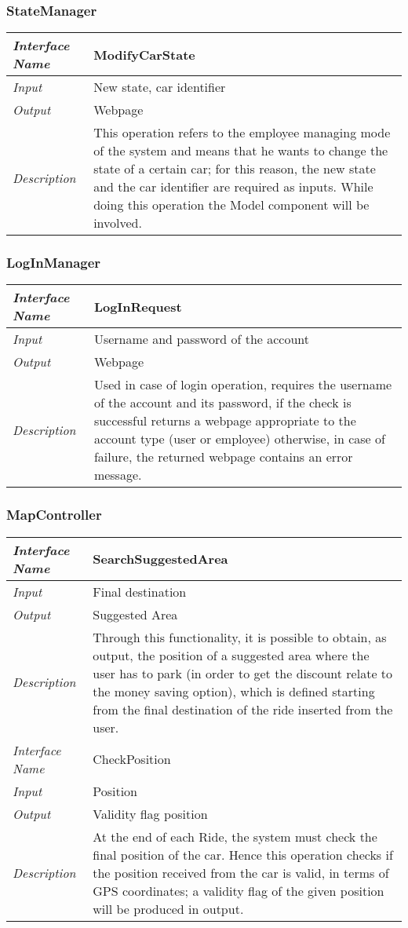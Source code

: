 \documentclass[11pt,a4paper]{report}
\begin{document}
\subsubsection{StateManager}
	\begin{tabularx}{\textwidth}{|>{\em}l|X|}
		\hline
		Interface Name& ModifyCarState\\
		\hline
		Input& New state, car identifier\\
		\hline
		Output & Webpage\\
		\hline
		Description &This operation refers to the employee managing mode of the system and means that he wants to change the state of a certain car; for this reason, the new state and the car identifier are required as inputs. While doing this operation the Model component will be involved.\\
		\hline
	\end{tabularx}
\subsubsection{LogInManager}
	\begin{tabularx}{\textwidth}{|>{\em}l|X|}
		\hline
		Interface Name& LogInRequest\\
		\hline
		Input & Username and password of the account\\
		\hline
		Output & Webpage\\
		\hline
		Description & Used in case of login operation, requires the username of the account and its password, if the check is successful returns a webpage appropriate to the account type (user or employee) otherwise, in case of failure, the returned webpage contains an error message.\\
		\hline
	\end{tabularx}
\subsubsection{MapController}
	\begin{tabularx}{\textwidth}{|>{\em}l|X|}
		\hline
		Interface Name& SearchSuggestedArea\\
		\hline
		Input & Final destination\\
		\hline
		Output & Suggested Area\\
		\hline
		Description &Through this functionality, it is possible to obtain, as output, the position of a suggested area where the user has to park (in order to get the discount relate to the money saving option), which is defined starting from the final destination of the ride inserted from the user.\\
		\hline
		\hline
		Interface Name& CheckPosition\\
		\hline
		Input & Position\\
		\hline
		Output & Validity flag position\\
		\hline
		Description &At the end of each Ride, the system must check the final position of the car. Hence this operation checks if the position received from the car is valid, in terms of GPS coordinates; a validity flag of the given position will be produced in output.\\
		\hline
	\end{tabularx}
\end{document}
